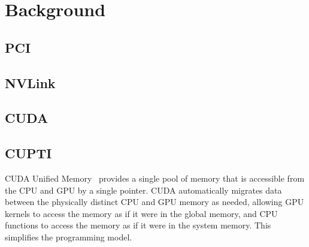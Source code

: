 \chapter{Background}

\section{PCI}

\section{NVLink}

\section{CUDA}

\section{CUPTI}
\label{sec:cupti}

CUDA Unified Memory~\cite{harris2013cudaunifiedmemory} provides a single pool of memory that is accessible from the CPU and GPU by a single pointer.
CUDA automatically migrates data between the physically distinct CPU and GPU memory as needed, allowing GPU kernels to access the memory as if it were in the global memory, and CPU functions to access the memory as if it were in the system memory.
This simplifies the programming model.